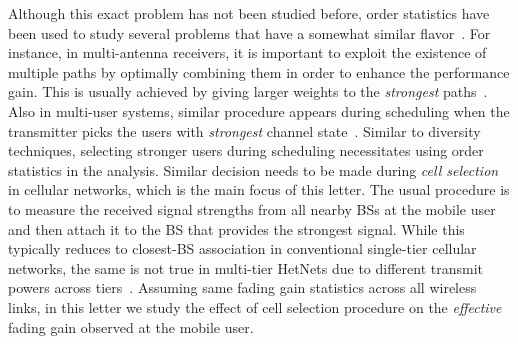 \documentclass[final]{IEEEtran}
\begin{document}
Although this exact problem has not been studied before, order statistics have been used to study several problems that have a somewhat similar flavor~\cite{yang2011order}. For instance, in multi-antenna receivers, it is important to exploit the existence of multiple paths by optimally combining them in order to enhance the performance gain. This is usually achieved by giving larger weights to the {\em strongest} paths~\cite{536918,837044,1350921}. Also in multi-user systems, similar procedure appears during scheduling when the transmitter picks the users with {\em strongest} channel state~\cite{1673689,4600211,4012549}. Similar to diversity techniques, selecting stronger users during scheduling necessitates using order statistics in the analysis. Similar decision needs to be made during {\em cell selection} in cellular networks, which is the main focus of this letter. The usual procedure is to measure the received signal strengths from all nearby BSs at the mobile user and then attach it to the BS that provides the strongest signal. While this typically reduces to closest-BS association in conventional single-tier cellular networks, the same is not true in multi-tier HetNets due to different transmit powers across tiers~\cite{DhiGanJ2012}. Assuming same fading gain statistics across all wireless links, in this letter we study the effect of cell selection procedure on the {\em effective} fading gain observed at the mobile user.
\end{document}
